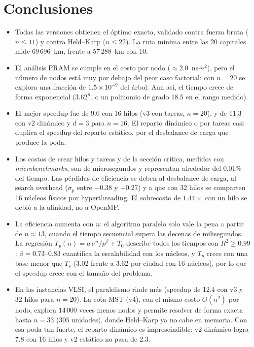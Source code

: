 \documentclass[12pt,a4paper]{article}
\begin{document}
\section{Conclusiones}
\begin{itemize}
    \item Todas las versiones obtienen el óptimo exacto, validado contra fuerza bruta ($n \le 11$) y contra Held--Karp ($n \le 22$). La ruta mínima entre las 20 capitales mide 69\,696~km, frente a 57\,288~km con 10.
    \item El análisis PRAM se cumple en el costo por nodo ($\approx 2.0$~ns$\cdot n^2$), pero el número de nodos está muy por debajo del peor caso factorial: con $n=20$ se explora una fracción de $1.5\times10^{-9}$ del árbol. Aun así, el tiempo crece de forma exponencial ($3.62^n$, o un polinomio de grado 18.5 en el rango medido).
    \item El mejor speedup fue de 9.0 con 16 hilos (v3 con tareas, $n=20$), y de 11.3 con v2 dinámico y $d=3$ para $n=16$. El reparto dinámico o por tareas casi duplica el speedup del reparto estático, por el desbalance de carga que produce la poda.
    \item Los costos de crear hilos y tareas y de la sección crítica, medidos con \textit{microbenchmarks}, son de microsegundos y representan alrededor del 0.01\% del tiempo. Las pérdidas de eficiencia se deben al desbalance de carga, al search overhead ($\sigma_p$ entre $-0.38$ y $+0.27$) y a que con 32 hilos se comparten 16 núcleos físicos por hyperthreading. El sobrecosto de $1.44\times$ con un hilo se debió a la afinidad, no a OpenMP.
    \item La eficiencia aumenta con $n$: el algoritmo paralelo solo vale la pena a partir de $n \approx 13$, cuando el tiempo secuencial supera las decenas de milisegundos. La regresión $T_p(n) = a\,c^{\,n}/p^{\beta} + T_0$ describe todos los tiempos con $R^2 \ge 0.99$: $\beta = 0.73$--$0.83$ cuantifica la escalabilidad con los núcleos, y $T_p$ crece con una base menor que $T_s$ (3.02 frente a 3.62 por ciudad con 16 núcleos), por lo que el speedup crece con el tamaño del problema.
    \item En las instancias VLSI, el paralelismo rinde más (speedup de 12.4 con v3 y 32 hilos para $n=20$). La cota MST (v4), con el mismo costo $O(n^2)$ por nodo, explora $14\,000$ veces menos nodos y permite resolver de forma exacta hasta $n=33$ (305 unidades), donde Held--Karp ya no cabe en memoria. Con esa poda tan fuerte, el reparto dinámico es imprescindible: v2 dinámico logra 7.8 con 16 hilos y v2 estático no pasa de 2.3.
\end{itemize}
\end{document}
